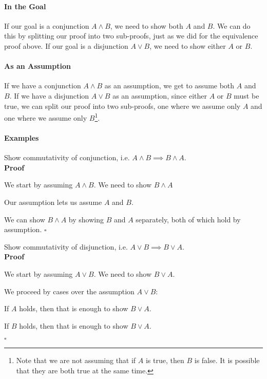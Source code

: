 \documentclass{tufte-handout}
\begin{document}
\paragraph{In the Goal}
If our goal is a conjunction $A \land B$, we need to show both $A$
and $B$. We can do this by splitting our proof into two
sub-proofs, just as we did for the equivalence proof above.
%
If our goal is a disjunction $A \lor B$, we need to show either
$A$ or $B$.

\paragraph{As an Assumption}
If we have a conjunction $A \land B$ as an assumption, we get to
assume both $A$ and $B$. If we have a disjunction $A \lor B$ as an
assumption, since either $A$ or $B$ must be true, we can split our
proof into two sub-proofs, one where we assume only $A$ and one
where we assume only $B$\footnote{Note that we are not assuming
  that if $A$ is true, then $B$ is false. It is possible that they
  are both true at the same time. }.


\paragraph{Examples}

\begin{itemize}
\item Show commutativity of conjunction, i.e. $A \land B \implies B \land A$.\\
  \textbf{Proof}
  \begin{compactenum}
  \item We start by assuming $A \land B$. We need to show $B \land A$
  \item Our assumption lets us assume $A$ and $B$.
  \item We can show $B \land A$ by showing $B$ and $A$ separately,
    both of which hold by assumption. $\square$
  \end{compactenum}
\item Show commutativity of disjunction, i.e. $A \lor B \implies B \lor A$.\\
  \textbf{Proof}
  \begin{compactenum}
  \item We start by assuming $A \lor B$. We need to show $B \lor A$.
  \item We proceed by cases over the assumption $A \lor B$:
    \begin{compactenum}
    \item If $A$ holds, then that is enough to show $B \lor A$.
    \item If $B$ holds, then that is enough to show $B \lor A$.
    \end{compactenum}
  \end{compactenum}
  $\square$
\end{itemize}
\end{document}
